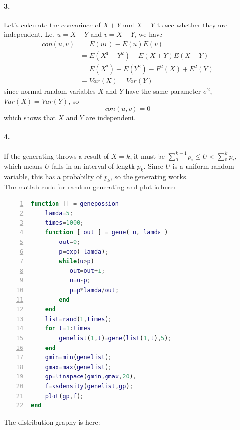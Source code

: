 \documentclass{article}
\begin{document}
\paragraph{3.}
Let's calculate the convarince of $X+Y$ and $X-Y$ to see whether they
are independent. Let $u = X+Y$ and $v = X-Y$, we have
\begin{align*}
con(u,v) &= E(uv) - E(u)E(v) \\
         &= E(X^2 - Y^2) - E(X+Y)E(X-Y) \\
         &= E(X^2) - E(Y^2) - E^2(X) + E^2(Y) \\
         &= Var(X) - Var(Y)
\end{align*}
since normal random variables $X$ and $Y$ have the same parameter
$\sigma ^2$, $Var(X) = Var(Y)$, so 
$$
con(u,v) = 0
$$
which shows that $X$ and $Y$ are independent.

\paragraph{4.}
If the generating throws a result of $X = k$, it must be
$\displaystyle \sum_{0}^{k-1}p_i \leq U < \sum_{0}^{k}p_i $, which means $U$ falls
in an interval of length $p_k$. Since $U$ is a uniform random
variable, this has a probabilty of $p_k$, so the generating works.
\\
The matlab code for random generating and plot is here:
\
\begin{lstlisting}[language=matlab,numbers=left]
function [] = genepossion
    lamda=5;
    times=1000;
    function [ out ] = gene( u, lamda )
        out=0;
        p=exp(-lamda);
        while(u>p)
           out=out+1; 
           u=u-p;
           p=p*lamda/out;
        end
    end
    list=rand(1,times);
    for t=1:times
        genelist(1,t)=gene(list(1,t),5);
    end
    gmin=min(genelist);
    gmax=max(genelist);
    gp=linspace(gmin,gmax,20);
    f=ksdensity(genelist,gp);
    plot(gp,f);
end
\end{lstlisting}
The distribution graphy is here:
\\
\end{document}
